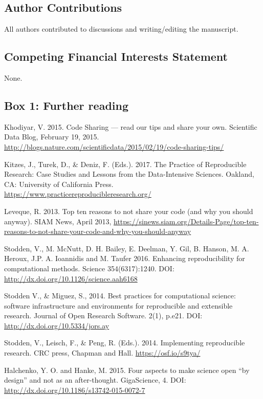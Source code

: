 \documentclass[11pt]{article}
\begin{document}
\subsection*{Author Contributions}
All authors contributed to discussions and writing/editing the manuscript.


\subsection*{Competing Financial Interests Statement}
None.

\printbibliography


\clearpage

\setlength{\parskip}{3mm}

\subsection*{Box 1: Further reading}

Khodiyar, V. 2015. Code Sharing --- read our tips and share your own. Scientific Data Blog, February 19, 2015. \url{http://blogs.nature.com/scientificdata/2015/02/19/code-sharing-tips/}

Kitzes, J., Turek, D., \& Deniz, F. (Eds.). 2017. The Practice of Reproducible Research: Case Studies and Lessons from the Data-Intensive Sciences. Oakland, CA: University of California Press. \url{https://www.practicereproducibleresearch.org/}

Leveque, R. 2013. Top ten reasons to not share your code (and why you
should anyway). SIAM News, April 2013, \url{https://sinews.siam.org/Details-Page/top-ten-reasons-to-not-share-your-code-and-why-you-should-anyway}


Stodden, V., M. McNutt, D. H. Bailey, E. Deelman, Y. Gil, B. Hanson, M. A. Heroux, J.P. A. Ioannidis and M. Taufer 2016. Enhancing reproducibility for computational methods. Science 354(6317):1240.  DOI: \url{http://dx.doi.org/10.1126/science.aah6168}

Stodden V., \& Miguez, S., 2014. Best practices for computational science: software infrastructure and environments for reproducible and extensible research. Journal of Open Research Software. 2(1), p.e21. DOI: \url{http://dx.doi.org/10.5334/jors.ay}

Stodden, V., Leisch, F., \& Peng, R. (Eds.). 2014. Implementing reproducible research. CRC press, Chapman and Hall. \url{https://osf.io/s9tya/}

Halchenko, Y. O. and Hanke, M. 2015. Four aspects to make science open
``by design'' and not as an after-thought. GigaScience, 4. DOI:
\url{http://dx.doi.org/10.1186/s13742-015-0072-7}
\end{document}
